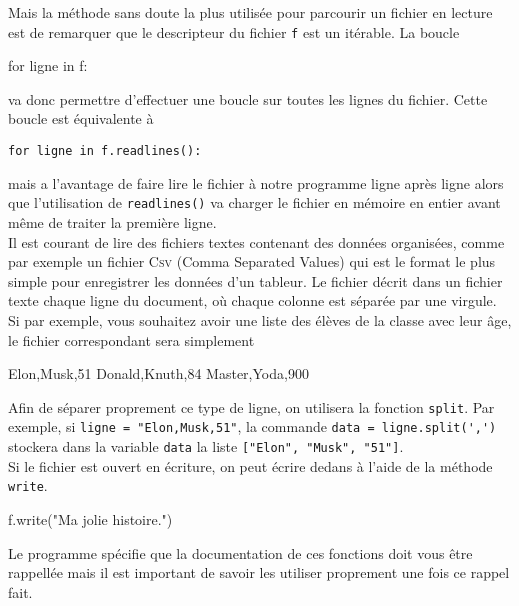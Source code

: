 \documentclass{magnolia}
\begin{document}
Mais la méthode sans doute la plus utilisée pour parcourir un fichier
en lecture est de remarquer que le descripteur du fichier \verb!f! est un itérable.
La boucle
\begin{pythoncode}
for ligne in f:
\end{pythoncode}
va donc permettre d'effectuer une boucle sur toutes les lignes du fichier. Cette boucle
est équivalente à
\begin{center}
  \verb!for ligne in f.readlines():!
\end{center}
mais a l'avantage de faire lire le fichier à notre programme ligne après ligne alors que
l'utilisation de \verb!readlines()! va charger le fichier en mémoire en entier avant même
de traiter la première ligne.\\

Il est courant de lire des fichiers textes contenant des données organisées, comme
par exemple un fichier \textsc{Csv} (Comma Separated Values) qui est le format le
plus simple pour enregistrer les données d'un tableur. Le fichier décrit dans un fichier
texte chaque ligne du document, où chaque colonne est séparée par une virgule. Si par
exemple, vous souhaitez avoir une liste des élèves de la classe avec leur âge, le fichier
 correspondant sera simplement
\begin{pythoncode}
Elon,Musk,51
Donald,Knuth,84
Master,Yoda,900
\end{pythoncode}
Afin de séparer proprement ce type de ligne, on utilisera la fonction \verb!split!.
Par exemple, si \verb!ligne = "Elon,Musk,51"!, la commande
\verb!data = ligne.split(',')! stockera dans la variable \verb!data! la liste
\verb!["Elon", "Musk", "51"]!.\\

Si le fichier est ouvert en écriture, on peut écrire dedans à l'aide de la méthode
\verb!write!.
\begin{pythoncode}
f.write("Ma jolie histoire.")
\end{pythoncode}

\medskip
Le programme spécifie que la documentation de ces fonctions doit vous être rappellée
mais il est important de savoir les utiliser proprement une fois ce rappel fait.


\end{document}
